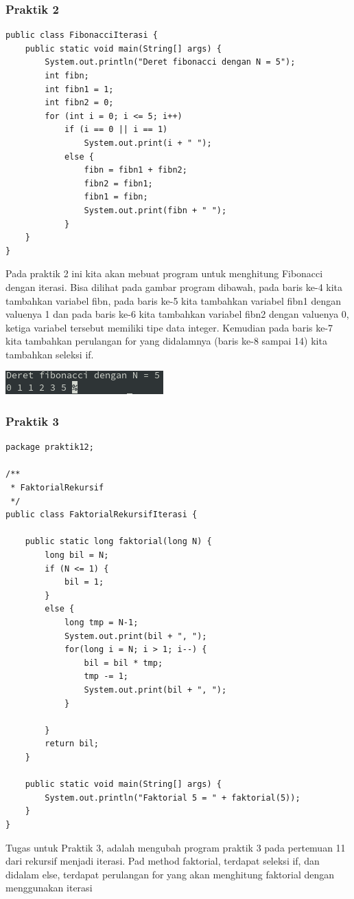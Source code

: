 \documentclass[a4paper,12pt]{article}
\begin{document}
\subsubsection{Praktik 2}
\begin{lstlisting}
public class FibonacciIterasi {
    public static void main(String[] args) {
        System.out.println("Deret fibonacci dengan N = 5");
        int fibn;
        int fibn1 = 1;
        int fibn2 = 0;
        for (int i = 0; i <= 5; i++)
            if (i == 0 || i == 1)
                System.out.print(i + " ");
            else {
                fibn = fibn1 + fibn2;
                fibn2 = fibn1;
                fibn1 = fibn;
                System.out.print(fibn + " ");
            }
    }
}
\end{lstlisting}
Pada praktik 2 ini kita akan mebuat program untuk menghitung Fibonacci dengan iterasi. Bisa dilihat pada gambar program dibawah, pada
baris ke-4 kita tambahkan variabel fibn, pada baris ke-5 kita tambahkan variabel fibn1 dengan valuenya 1 dan pada baris
ke-6 kita tambahkan variabel fibn2 dengan valuenya 0, ketiga variabel tersebut memiliki tipe data integer. Kemudian pada
baris ke-7 kita tambahkan perulangan for yang didalamnya (baris ke-8 sampai 14) kita tambahkan seleksi if.

\begin{center}
    \includegraphics[scale=1]{2.png} 
\end{center}


\subsubsection{Praktik 3}
\begin{lstlisting}
package praktik12;

/**
 * FaktorialRekursif
 */
public class FaktorialRekursifIterasi {

    public static long faktorial(long N) {
        long bil = N;
        if (N <= 1) {
            bil = 1;
        }
        else {
            long tmp = N-1;
            System.out.print(bil + ", ");
            for(long i = N; i > 1; i--) {
                bil = bil * tmp;
                tmp -= 1;
                System.out.print(bil + ", ");
            }
                
        }
        return bil;
    }

    public static void main(String[] args) {
        System.out.println("Faktorial 5 = " + faktorial(5));
    }
}
\end{lstlisting}
Tugas untuk Praktik 3, adalah mengubah program praktik 3 pada pertemuan 11 dari rekursif menjadi iterasi. Pad method
faktorial, terdapat seleksi if, dan didalam else, terdapat perulangan for yang akan menghitung faktorial dengan
menggunakan iterasi
\end{document}
